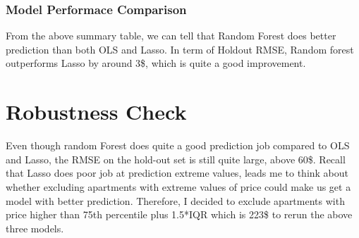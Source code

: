 \documentclass[
]{article}
\begin{document}
\hypertarget{model-performace-comparison}{%
\subsubsection{Model Performace
Comparison}\label{model-performace-comparison}}

\begin{table}[!h]
\centering
{}
\end{table}

From the above summary table, we can tell that Random Forest does better
prediction than both OLS and Lasso. In term of Holdout RMSE, Random
forest outperforms Lasso by around 3\$, which is quite a good
improvement.

\hypertarget{robustness-check}{%
\section{Robustness Check}\label{robustness-check}}

Even though random Forest does quite a good prediction job compared to
OLS and Lasso, the RMSE on the hold-out set is still quite large, above
60\$. Recall that Lasso does poor job at prediction extreme values,
leads me to think about whether excluding apartments with extreme values
of price could make us get a model with better prediction. Therefore, I
decided to exclude apartments with price higher than 75th percentile
plus 1.5*IQR which is 223\$ to rerun the above three models.

\begin{table}[!h]
\centering
{}
\end{table}
\end{document}
